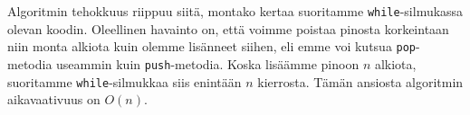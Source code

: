 Algoritmin tehokkuus riippuu siitä, montako kertaa suoritamme
\texttt{while}-silmukassa olevan koodin.
Oleellinen havainto on, että voimme poistaa pinosta
korkeintaan niin monta alkiota kuin olemme lisänneet siihen,
eli emme voi kutsua \texttt{pop}-metodia useammin kuin \texttt{push}-metodia.
Koska lisäämme pinoon $n$ alkiota, suoritamme \texttt{while}-silmukkaa
siis enintään $n$ kierrosta.
Tämän ansiosta algoritmin aikavaativuus on $O(n)$.